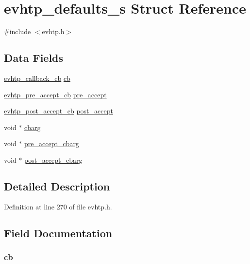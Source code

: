 \hypertarget{structevhtp__defaults__s}{\section{evhtp\-\_\-defaults\-\_\-s Struct Reference}
\label{structevhtp__defaults__s}
}


{\ttfamily \#include $<$evhtp.\-h$>$}

\subsection*{Data Fields}
\begin{DoxyCompactItemize}
\item 
\hyperlink{evhtp_8h_a7339527d6a07b47cd28bf29572c9e082}{evhtp\-\_\-callback\-\_\-cb} \hyperlink{structevhtp__defaults__s_a783ee29046d4ff3e8c75f811e80fd57b}{cb}
\item 
\hyperlink{evhtp_8h_a784dd458a41ff3263ad135b259b9e8fc}{evhtp\-\_\-pre\-\_\-accept\-\_\-cb} \hyperlink{structevhtp__defaults__s_a479402c7d67e5e23cb7e9a3262b6b707}{pre\-\_\-accept}
\item 
\hyperlink{evhtp_8h_ac99d7878808d4cc1422d9aff7b6c121c}{evhtp\-\_\-post\-\_\-accept\-\_\-cb} \hyperlink{structevhtp__defaults__s_a0b645f2619a137a4e299e28c1fe208a8}{post\-\_\-accept}
\item 
void $\ast$ \hyperlink{structevhtp__defaults__s_aafd3d1a6343925cb274875556a6faa0e}{cbarg}
\item 
void $\ast$ \hyperlink{structevhtp__defaults__s_a0f92afb003b402ad524c0a95d13b4fb7}{pre\-\_\-accept\-\_\-cbarg}
\item 
void $\ast$ \hyperlink{structevhtp__defaults__s_a44bb35b51726d7c4e775a347b3dbc3f0}{post\-\_\-accept\-\_\-cbarg}
\end{DoxyCompactItemize}


\subsection{Detailed Description}


Definition at line 270 of file evhtp.\-h.



\subsection{Field Documentation}
\hypertarget{structevhtp__defaults__s_a783ee29046d4ff3e8c75f811e80fd57b}{
\subsubsection[{cb}]{ cb}}\label{structevhtp__defaults__s_a783ee29046d4ff3e8c75f811e80fd57b}


